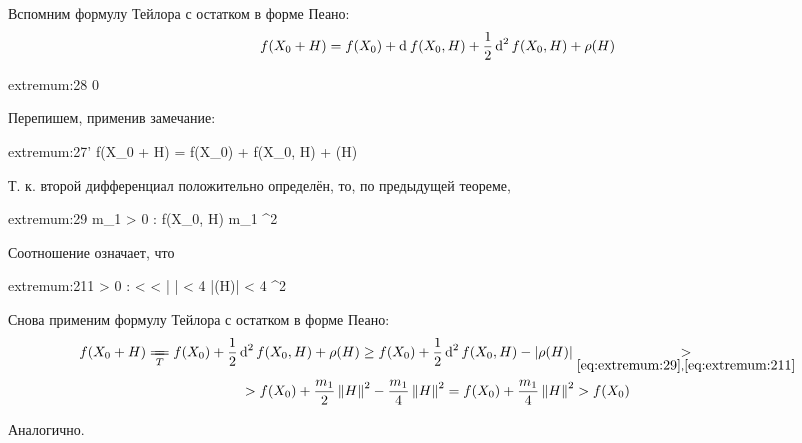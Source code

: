 \begin{eproof}
	\item Вспомним формулу Тейлора с остатком в форме Пеано:
	$$ f(X_0 + H) = f(X_0) + \di f(X_0, H) + \half \di[2] f(X_0, H) + \rho(H) $$
	\begin{equ}{extremum:28}
		   0
	\end{equ}
	Перепишем, применив замечание:
	\begin{equ}{extremum:27'}
		f(X_0 + H) = f(X_0) + \half \di[2] f(X_0, H) + \rho(H)
	\end{equ}
	Т. к. второй дифференциал положительно определён, то, по предыдущей теореме,
	\begin{equ}{extremum:29}
		\exist m_1 > 0 : \di[2] f(X_0, H) \ge m_1 ^2
	\end{equ}
	Соотношение  означает, что
	\begin{equ}{extremum:211}
		\exist \delta > 0 :  <  < \delta \quad \bigg|  \bigg| < 4 \qquad \iff |\rho(H)| < 4 ^2
	\end{equ}
	Снова применим формулу Тейлора с остатком в форме Пеано:
	\begin{multline*}
		f(X_0 + H) \undereq T f(X_0) + \half\di[2] f(X_0, H) + \rho(H) \ge f(X_0) + \half \di[2] f(X_0, H) - |\rho(H)| \underset{\eref{extremum:29}, \eref{extremum:211}}> \\
		> f(X_0) + \half[m_1]\norm{H}^2 - \frac{m_1}4\norm{H}^2 = f(X_0) + \frac{m_1}4\norm{H}^2 > f(X_0)
	\end{multline*}

	\item Аналогично.


\end{eproof}
